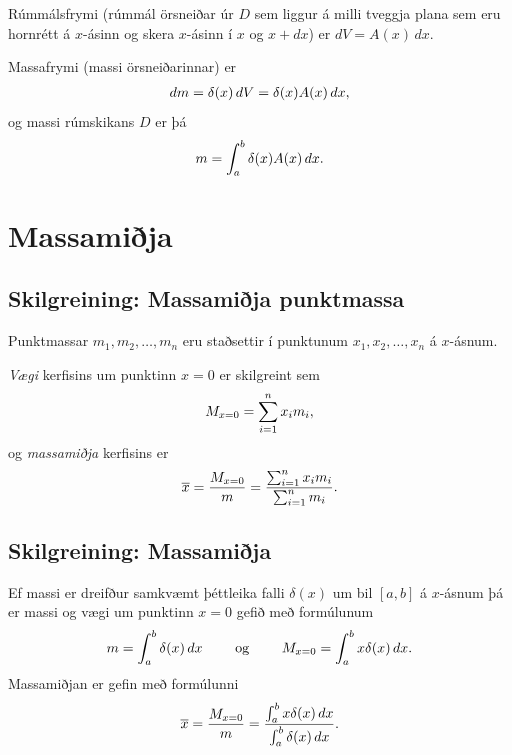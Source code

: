 \documentclass[a4paper,10pt,icelandic]{sphinxmanual}
\begin{document}
Rúmmálsfrymi (rúmmál örsneiðar úr \(D\) sem liggur á milli tveggja
plana sem eru hornrétt á \(x\)-ásinn og skera \(x\)-ásinn í
\(x\) og \(x+dx\)) er \(dV=A(x)\, dx\).

Massafrymi (massi örsneiðarinnar) er
\begin{gather}
\begin{split}dm=\delta(x)\, dV = \delta(x) A(x)\, dx,\end{split}\notag
\end{gather}
og massi rúmskikans \(D\) er þá
\begin{gather}
\begin{split}m=\int_a^b \delta(x)A(x)\, dx.\end{split}\notag
\end{gather}

\section{Massamiðja}
\label{kafli07:index-13}\label{kafli07:massamija}

\subsection{Skilgreining: Massamiðja punktmassa}
\label{kafli07:skilgreining-massamija-punktmassa}
Punktmassar \(m_1, m_2, \ldots, m_n\) eru staðsettir í punktunum
\(x_1,
x_2, \ldots, x_n\) á \(x\)-ásnum.

\textit{Vægi} kerfisins um punktinn \(x=0\) er skilgreint sem
\begin{gather}
\begin{split}M_{x=0}=\sum_{i=1}^n x_im_i,\end{split}\notag
\end{gather}
og \textit{massamiðja} kerfisins er
\begin{gather}
\begin{split}\overline{x}=\frac{M_{x=0}}{m} = \frac{\sum_{i=1}^n x_im_i}{\sum_{i=1}^n m_i}.\end{split}\notag
\end{gather}

\subsection{Skilgreining: Massamiðja}
\label{kafli07:skilgreining-massamija}
Ef massi er dreifður samkvæmt þéttleika falli \(\delta(x)\) um bil
\([a, b]\) á \(x\)-ásnum þá er massi og vægi um punktinn
\(x=0\) gefið með formúlunum
\begin{gather}
\begin{split}m=\int_a^b \delta(x)\,dx
\qquad\mbox{ og }\qquad
M_{x=0}= \int_a^b x\delta(x)\,dx.\end{split}\notag
\end{gather}
Massamiðjan er gefin með formúlunni
\begin{gather}
\begin{split}\overline{x}=\frac{M_{x=0}}{m}   =
\frac{\int_a^b x\delta(x)\,dx}{\int_a^b \delta(x)\,dx}.\end{split}\notag
\end{gather}
\end{document}
